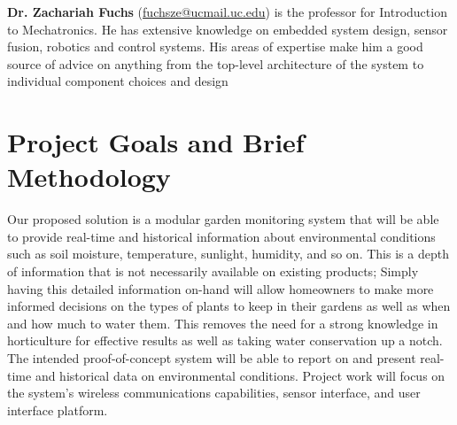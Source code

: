 \documentclass{report}
\begin{document}
\textbf{Dr. Zachariah Fuchs} (\href{fuchsze@ucmail.uc.edu}{fuchsze@ucmail.uc.edu}) is the professor for Introduction to Mechatronics. He has extensive knowledge on embedded system design, sensor fusion, robotics and control systems. His areas of expertise make him a good source of advice on anything from the top-level architecture of the system to individual component choices and design\\

\section{Project Goals and Brief Methodology}
Our proposed solution is a modular garden monitoring system that will be able to provide real-time and historical information about environmental conditions such as soil moisture, temperature, sunlight, humidity, and so on. This is a depth of information that is not necessarily available on existing products; Simply having this detailed information on-hand will allow homeowners to make more informed decisions on the types of plants to keep in their gardens as well as when and how much to water them. This removes the need for a strong knowledge in horticulture for effective results as well as taking water conservation up a notch. The intended proof-of-concept system will be able to report on and present real-time and historical data on environmental conditions. Project work will focus on the system's wireless communications capabilities, sensor interface, and user interface platform.\\
\end{document}
